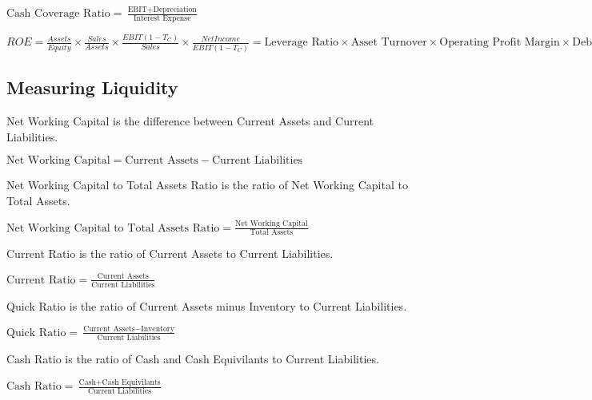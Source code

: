 $\text{Cash Coverage Ratio} = \frac{\text{EBIT} + \text{Depreciation}}{\text{Interest Expense}}$

$ROE = \frac{Assets}{Equity} \times \frac{Sales}{Assets} \times \frac{EBIT(1-T_C)}{Sales} \times \frac{Net Income}{EBIT(1-T_C)} =  \text{Leverage Ratio} \times \text{Asset Turnover} \times \text{Operating Profit Margin} \times \text{Debt Burden}$


\subsection{Measuring Liquidity}

Net Working Capital is the difference between Current Assets and Current Liabilities.

$\text{Net Working Capital} = \text{Current Assets} - \text{Current Liabilities}$

Net Working Capital to Total Assets Ratio is the ratio of Net Working Capital to Total Assets.

$\text{Net Working Capital to Total Assets Ratio} = \frac{\text{Net Working Capital}}{\text{Total Assets}}$

Current Ratio is the ratio of Current Assets to Current Liabilities.

$\text{Current Ratio} = \frac{\text{Current Assets}}{\text{Current Liabilities}}$

Quick Ratio is the ratio of Current Assets minus Inventory to Current Liabilities.

$\text{Quick Ratio} = \frac{\text{Current Assets} - \text{Inventory}}{\text{Current Liabilities}}$

Cash Ratio is the ratio of Cash and Cash Equivilants to Current Liabilities.

$\text{Cash Ratio} = \frac{\text{Cash} + \text{Cash Equivilants}}{\text{Current Liabilities}}$



